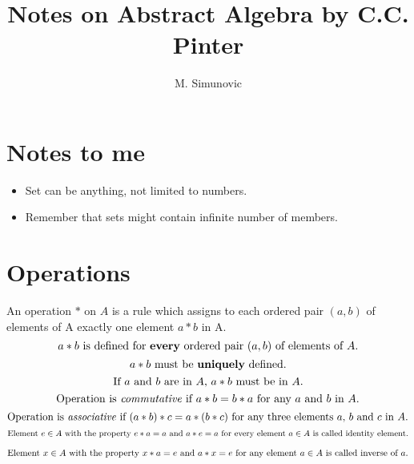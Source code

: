 \documentclass[12pt]{article}
\title{Notes on Abstract Algebra by C.C. Pinter}
\author{M. Simunovic}
\begin{document}
\maketitle

\section*{Notes to me}
\begin{itemize}
        \item Set can be anything, not limited to numbers.
        \item Remember that sets might contain infinite number of members.
\end{itemize}
\section*{Operations}
An operation $*$ on $A$ is a rule which assigns to each ordered pair $(a,b)$ of elements of A exactly one element $a * b$ in A.
\begin{equation}
        \textnormal{$a * b$ is defined for \textbf{every} ordered pair $(a, b)$ of elements of $A$.}
\end{equation}
\begin{equation}
        \textnormal{$a * b$ must be \textbf{uniquely} defined.}
\end{equation}
\begin{equation}
        \textnormal{If $a$ and $b$ are in $A$, $a * b$ must be in $A$.}
\end{equation}
\begin{equation}
        \textnormal{Operation is \textit{commutative} if $a * b = b * a$ for any $a$ and $b$ in $A$.}
\end{equation}
\begin{equation}
        \textnormal{Operation is \textit{associative} if $(a * b) * c = a * (b * c)$ for any three elements $a$, $b$ and $c$ in $A$.}
\end{equation}
\begin{equation}
        \textnormal{Element $e \in A$ with the property $e * a = a$ and $a * e = a$ for every element $a \in A$ is called identity element.}
\end{equation}

\begin{equation}
        \textnormal{Element $x \in A$ with the property $x * a = e$ and $a * x = e$ for any element $a \in A$ is called inverse of $a$.}
\end{equation}
\end{document}
